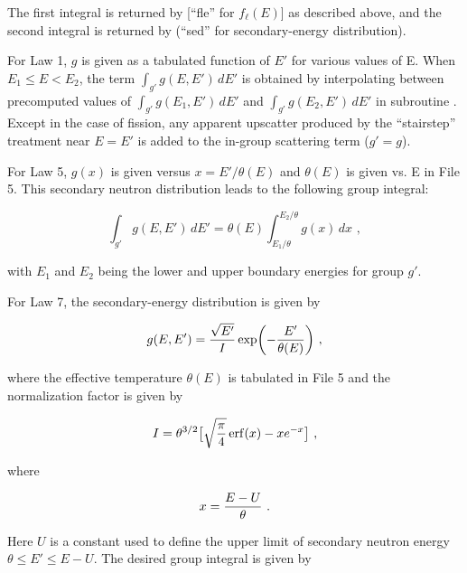 \noindent
The first integral is returned by  [``fle'' for $f_\ell (E)$]
as described above, and the second integral is returned by 
(``sed'' for secondary-energy distribution).

For Law 1, $g$ is given as a tabulated function of $E'$ for various
values of E.  When $E_1\leq E<E_2$, the term $\int_{g'} g(E,E')\,dE'$ is
obtained by interpolating between precomputed values of
$\int_{g'} g(E_1,E')\,dE'$ and $\int_{g'} g(E_2,E')\,dE'$ in subroutine
.  Except in the case of fission, any apparent upscatter
produced by the ``stairstep'' treatment near $E{=}E'$ is added to the
in-group scattering term ($g'{=}g$).

For Law 5, $g(x)$ is given versus $x=E'/\theta(E)$ and $\theta(E)$
is given vs. E in File 5.  This secondary neutron distribution leads to
the following group integral:

  \begin{equation}
    \int_{g'}g(E,E')\,dE'=\theta(E)
    \int_{E_1/\theta}^{E_2/\theta}g(x)\,dx\,\,,
  \end{equation}
\vspace{0.5 pt}

\noindent
with $E_1$ and $E_2$ being the lower and upper boundary energies
for group $g'$.

For Law 7, the secondary-energy distribution is given by

  \begin{equation}
    g(E,E')={{\sqrt{E'}}\over I} \exp \biggl( {-{{E'}
    \over{\theta(E)}}} \biggr) \,\,,
  \label{Eq86}
  \end{equation}
\vspace{0.5 pt}

\noindent
where the effective temperature $\theta(E)$ is tabulated in File 5
and the normalization factor is given by

  \begin{equation}
    I=\theta^{3/2} \bigl[ {\sqrt{\pi \over 4}}
    {\,\rm erf}(x) - x e^{-x} \bigr]\,\,,
  \end{equation}
\vspace{0.5 pt}

\noindent
where

  \begin{equation}
    x={{E-U}\over \theta}\,\,.
  \label{Eq88}
  \end{equation}
\vspace{0.5 pt}

\noindent
Here $U$ is a constant used to define the upper limit of secondary
neutron energy $\theta \le E' \le E{-}U$.  The desired group integral
is given by


